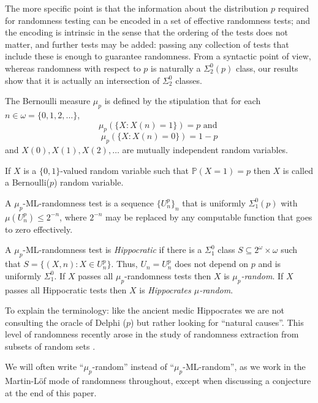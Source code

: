 The more specific point is that the information about the distribution $p$ required for randomness testing can be encoded in a set of effective randomness tests; and the encoding is intrinsic in the sense that the ordering of the tests does not matter, and further tests may be added: passing any collection of tests that include these is enough to guarantee randomness. From a syntactic point of view, whereas randomness with respect to $p$ is naturally a $\Sigma^0_2(p)$ class, our results show that it is actually an intersection of $\Sigma^0_{2}$ classes.

\begin{definition}\label{bernoulli}
	\leanok
The Bernoulli measure $\mu_{p}$ is defined by the stipulation that for each $n\in\omega=\{0,1,2,\ldots\}$, 
\[
\mu_p(\{X: X(n)=1\})=p \text{ and }
\]
\[
\mu_p(\{X:X(n)=0\})=1-p
\]
and $X(0),X(1),X(2),\ldots$ are mutually independent random variables.
\end{definition}
If $X$ is a $\{0,1\}$-valued random variable such that $\mathbb P(X=1) = p$ then $X$ is called a Bernoulli($p$) random variable.
		

\begin{definition}\label{MLR}
	A $\mu_p$-ML-randomness test is a sequence $\{U^p_n\}_n$ that is uniformly $\Sigma^0_1(p)$ with $\mu(U^p_n)\le 2^{-n}$, where $2^{-n}$ may be replaced by any computable function that goes to zero effectively. 
	 
	A $\mu_p$-ML-randomness test is \emph{Hippocratic} if there is a $\Sigma^0_1$ class $S\subseteq 2^\omega\times\omega$ such that $S=\{(X,n):X\in U_n^p\}$. Thus, $U_n=U_n^p$ does not depend on $p$ and is uniformly $\Sigma^0_1$.  
If $X$ passes all $\mu_p$-randomness tests then $X$ is \emph{$\mu_p$-random}. If $X$ passes all Hippocratic tests then $X$ is \emph{Hippocrates $\mu$-random}.
\end{definition}

To explain the terminology: like the ancient medic Hippocrates we are not consulting the oracle of Delphi ($p$) but rather looking for ``natural causes''. This level of randomness recently arose in the study of randomness extraction from subsets of random sets \cite{MRL}.

We will often write ``$\mu_p$-random'' instead of ``$\mu_p$-ML-random'', as we work in the Martin-L\"of mode of randomness throughout, except when discussing a conjecture at the end of this paper.



